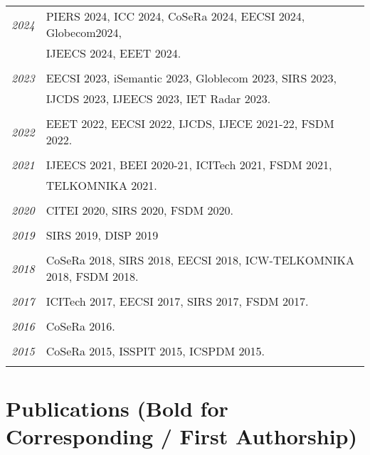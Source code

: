 \documentclass[paper=a4,fontsize=11pt]{scrartcl}
\begin{document}
\begin{longtable}{r|p{12cm}}
	\emph{2024} & PIERS 2024, ICC 2024, CoSeRa 2024, EECSI 2024, Globecom2024, \\
		& IJEECS 2024, EEET 2024. \\
	\multicolumn{2}{c}{} \\
	
	\emph{2023} & EECSI 2023, iSemantic 2023, Globlecom 2023, SIRS 2023, \\
		& IJCDS 2023, IJEECS 2023, IET Radar 2023. \\
	\multicolumn{2}{c}{} \\
	
	\emph{2022} & EEET 2022, EECSI 2022, IJCDS, IJECE 2021-22, FSDM 2022. \\
	\multicolumn{2}{c}{} \\
	
	\emph{2021} & IJEECS 2021, BEEI 2020-21, ICITech 2021, FSDM 2021, \\
		& TELKOMNIKA 2021. \\
	\multicolumn{2}{c}{} \\
	
	\emph{2020} & CITEI 2020, SIRS 2020, FSDM 2020. \\
	\multicolumn{2}{c}{} \\
	
	\emph{2019} & SIRS 2019, DISP 2019 \\
	\multicolumn{2}{c}{} \\
	
	\emph{2018} & CoSeRa 2018, SIRS 2018, EECSI 2018, ICW-TELKOMNIKA 2018, FSDM 2018.\\
	\multicolumn{2}{c}{} \\
	
	\emph{2017} & ICITech 2017, EECSI 2017, SIRS 2017, FSDM 2017.\\
	\multicolumn{2}{c}{} \\
	
	\emph{2016} & CoSeRa 2016.\\
	\multicolumn{2}{c}{} \\
	
	\emph{2015} & CoSeRa 2015, ISSPIT 2015, ICSPDM 2015.\\
	\multicolumn{2}{c}{}
\end{longtable}






\section*{Publications (Bold for Corresponding / First Authorship)}
\end{document}
